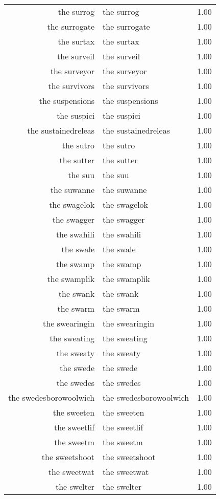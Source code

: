 \begin{table}[ht]
\begin{tabular}{rlr}
  the surrog & the surrog & 1.00 \\ 
  the surrogate & the surrogate & 1.00 \\ 
  the surtax & the surtax & 1.00 \\ 
  the surveil & the surveil & 1.00 \\ 
  the surveyor & the surveyor & 1.00 \\ 
  the survivors & the survivors & 1.00 \\ 
  the suspensions & the suspensions & 1.00 \\ 
  the suspici & the suspici & 1.00 \\ 
  the sustainedreleas & the sustainedreleas & 1.00 \\ 
  the sutro & the sutro & 1.00 \\ 
  the sutter & the sutter & 1.00 \\ 
  the suu & the suu & 1.00 \\ 
  the suwanne & the suwanne & 1.00 \\ 
  the swagelok & the swagelok & 1.00 \\ 
  the swagger & the swagger & 1.00 \\ 
  the swahili & the swahili & 1.00 \\ 
  the swale & the swale & 1.00 \\ 
  the swamp & the swamp & 1.00 \\ 
  the swamplik & the swamplik & 1.00 \\ 
  the swank & the swank & 1.00 \\ 
  the swarm & the swarm & 1.00 \\ 
  the swearingin & the swearingin & 1.00 \\ 
  the sweating & the sweating & 1.00 \\ 
  the sweaty & the sweaty & 1.00 \\ 
  the swede & the swede & 1.00 \\ 
  the swedes & the swedes & 1.00 \\ 
  the swedesborowoolwich & the swedesborowoolwich & 1.00 \\ 
  the sweeten & the sweeten & 1.00 \\ 
  the sweetlif & the sweetlif & 1.00 \\ 
  the sweetm & the sweetm & 1.00 \\ 
  the sweetshoot & the sweetshoot & 1.00 \\ 
  the sweetwat & the sweetwat & 1.00 \\ 
  the swelter & the swelter & 1.00 \\ 

\end{tabular}
\end{table}
